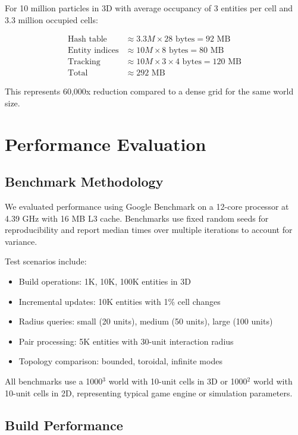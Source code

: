 \documentclass[11pt]{article}
\begin{document}
For 10 million particles in 3D with average occupancy of 3 entities per cell and 3.3 million occupied cells:

\begin{align*}
\text{Hash table} &\approx 3.3M \times 28\text{ bytes} = 92\text{ MB} \\
\text{Entity indices} &\approx 10M \times 8\text{ bytes} = 80\text{ MB} \\
\text{Tracking} &\approx 10M \times 3 \times 4\text{ bytes} = 120\text{ MB} \\
\text{Total} &\approx 292\text{ MB}
\end{align*}

This represents 60,000x reduction compared to a dense grid for the same world size.

\section{Performance Evaluation}

\subsection{Benchmark Methodology}

We evaluated performance using Google Benchmark on a 12-core processor at 4.39 GHz with 16 MB L3 cache. Benchmarks use fixed random seeds for reproducibility and report median times over multiple iterations to account for variance.

Test scenarios include:
\begin{itemize}
\item Build operations: 1K, 10K, 100K entities in 3D
\item Incremental updates: 10K entities with 1\% cell changes
\item Radius queries: small (20 units), medium (50 units), large (100 units)
\item Pair processing: 5K entities with 30-unit interaction radius
\item Topology comparison: bounded, toroidal, infinite modes
\end{itemize}

All benchmarks use a 1000$^3$ world with 10-unit cells in 3D or 1000$^2$ world with 10-unit cells in 2D, representing typical game engine or simulation parameters.

\subsection{Build Performance}
\end{document}
